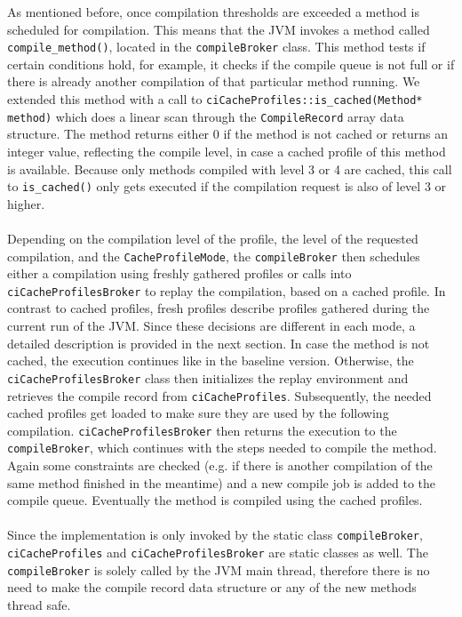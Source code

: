 As mentioned before, once compilation thresholds are exceeded a method is scheduled for compilation. This means that the JVM invokes a method called \texttt{compile\_method()}, located in the \texttt{compileBroker} class. This method tests if certain conditions hold, for example, it checks if the compile queue is not full or if there is already another compilation of that particular method running.
We extended this method with a call to \texttt{ciCacheProfiles::is\_cached(Method* method)} which does a linear scan through the \texttt{CompileRecord} array data structure. The method returns either 0 if the method is not cached or returns an integer value, reflecting the compile level, in case a cached profile of this method is available. Because only methods compiled with level 3 or 4 are cached, this call to \texttt{is\_cached()} only gets executed if the compilation request is also of level 3 or higher.\\\\
Depending on the compilation level of the profile, the level of the requested compilation, and the \texttt{CacheProfileMode}, the \texttt{compileBroker} then schedules either a compilation using freshly gathered profiles or calls into \texttt{ciCacheProfilesBroker} to replay the compilation, based on a cached profile. In contrast to cached profiles, fresh profiles describe profiles gathered during the current run of the JVM. Since these decisions are different in each mode, a detailed description is provided in the next section.
In case the method is not cached, the execution continues like in the baseline version.
Otherwise, the \texttt{ciCacheProfilesBroker} class then initializes the replay environment and retrieves the compile record from \texttt{ciCacheProfiles}. Subsequently, the needed cached profiles get loaded to make sure they are used by the following compilation. \texttt{ciCacheProfilesBroker} then returns the execution to the \texttt{compileBroker}, which continues with the steps needed to compile the method. Again some constraints are checked (e.g. if there is another compilation of the same method finished in the meantime) and a new compile job is added to the compile queue. Eventually the method is compiled using the cached profiles.
\\\\
Since the implementation is only invoked by the static class \texttt{compileBroker}, \texttt{ciCacheProfiles} and \texttt{ciCacheProfilesBroker} are static classes as well. The \texttt{compileBroker} is solely called by the JVM main thread, therefore there is no need to make the compile record data structure or any of the new methods thread safe. 

